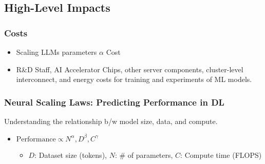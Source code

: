 \subsection{High-Level Impacts}
\subsubsection{Costs}
\begin{notes}
    \begin{itemize}
        \item Scaling LLMs parameters $\alpha$ Cost 
        \item R\&D Staff, AI Accelerator Chips, other server components, cluster-level interconnect, and energy costs for training and experiments of ML models. 
    \end{itemize}
\end{notes}

\subsubsection{Neural Scaling Laws: Predicting Performance in DL}
\begin{notes}
    Understanding the relationship b/w model size, data, and compute. 
    \begin{itemize}
        \item $\text{Performance} \propto N^{\alpha}, D^{\beta}, C^{\gamma}$
        \begin{itemize}
            \item $D$: Dataset size (tokens), $N$: \# of parameters, $C$: Compute time (FLOPS)
        \end{itemize}
        \vspace{-1em}
        \vspace{-1em}
    \end{itemize}
\end{notes}

